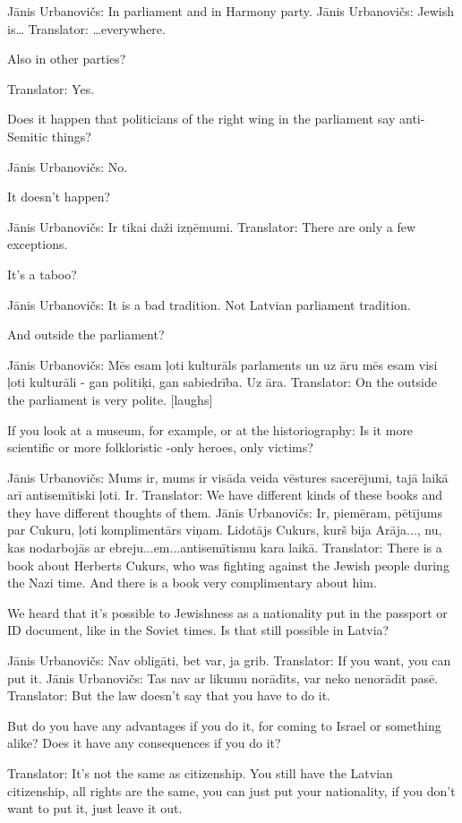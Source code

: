 Jānis Urbanovičs: In parliament and in Harmony party.  
Jānis Urbanovičs: Jewish is… 
Translator: …everywhere. 

Also in other parties?  

Translator: Yes. 

Does it happen that politicians of the right wing in the parliament say anti-Semitic things?  

Jānis Urbanovičs: No.  

It doesn't happen? 

Jānis Urbanovičs: Ir tikai daži izņēmumi.  
Translator: There are only a few exceptions.  

It's a taboo? 

Jānis Urbanovičs: It is a bad tradition. Not Latvian parliament tradition. 

And outside the parliament?  

Jānis Urbanovičs: Mēs esam ļoti kulturāls parlaments un uz āru mēs esam visi ļoti kulturāli - gan politiķi, gan sabiedrība. Uz āra.  
Translator: On the outside the parliament is very polite. [laughs] 

If you look at a museum, for example, or at the historiography: Is it more scientific or more folkloristic -only heroes, only victims?  

Jānis Urbanovičs: Mums ir, mums ir visāda veida vēstures sacerējumi, tajā laikā arī antisemītiski ļoti. Ir. 
Translator: We have different kinds of these books and they have different thoughts of them.  
Jānis Urbanovičs: Ir, piemēram, pētījums par Cukuru, ļoti komplimentārs viņam. Lidotājs Cukurs, kurš bija Arāja..., nu, kas nodarbojās ar ebreju...em...antisemītismu kara laikā.  
Translator: There is a book about Herberts Cukurs, who was fighting against the Jewish people during the Nazi time. And there is a book very complimentary about him. 

We heard that it's possible to Jewishness as a nationality put in the passport or ID document, like in the Soviet times. Is that still possible in Latvia?  

Jānis Urbanovičs: Nav obligāti, bet var, ja grib. 
Translator: If you want, you can put it. 
Jānis Urbanovičs: Tas nav ar likumu norādīts, var neko nenorādīt pasē.  
Translator: But the law doesn't say that you have to do it.  

But do you have any advantages if you do it, for coming to Israel or something alike? Does it have any consequences if you do it?  

Translator: It’s not the same as citizenship. You still have the Latvian citizenship, all rights are the same, you can just put your nationality, if you don't want to put it, just leave it out.  

